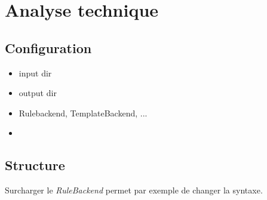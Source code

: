 \section{Analyse technique}
	
	\subsection{Configuration}
	
		\begin{itemize}
			\item input dir
			\item output dir
			\item Rulebackend, TemplateBackend, ...
			\item 
		\end{itemize}
	
	\subsection{Structure}
	
	Surcharger le \textit{RuleBackend} permet par exemple de changer la syntaxe.